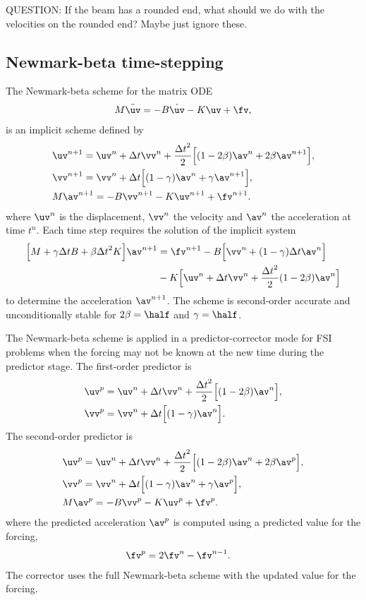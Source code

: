 \documentclass[11pt]{article}
\newcommand{\dt}{{\Delta t}}
\begin{document}
QUESTION: If the beam has a rounded end, what should we do with the velocities on the rounded end? Maybe just ignore
these. 


\subsection{Newmark-beta time-stepping}
The Newmark-beta scheme for the matrix ODE 
\begin{align*}
   M \ddot\uv = -B \dot\uv - K \uv + \fv ,
\end{align*}
is an implicit scheme defined by
\begin{align*}
 &  \uv^{n+1} = \uv^n + \dt\vv^n + \frac{\dt^2}{2}\Big[ (1-2\beta) \av^n + 2\beta \av^{n+1} \Big],  \\
 &  \vv^{n+1} = \vv^n + \dt\Big[  (1-\gamma) \av^n + \gamma \av^{n+1} \Big]    , \\
 &  M \av^{n+1} = -B \vv^{n+1} -K \uv^{n+1} + \fv^{n+1} .
\end{align*}
where $\uv^n$ is the displacement, $\vv^n$ the velocity and $\av^n$ the acceleration at time $t^n$. 
Each time step requires the solution of the implicit system
\begin{align}
  \Big[ M + \gamma\dt B + \beta\dt^2 K \Big] \av^{n+1} &=
      \fv^{n+1} 
      - B \Big[ \vv^n + (1-\gamma) \dt \av^n \Big] \nonumber \\
    &  - K\Big[ \uv^n + \dt\vv^n + \frac{\dt^2}{2} (1-2\beta) \av^n \Big] 
   \label{eq:NewmarkMatrix}
\end{align}
to determine the acceleration $\av^{n+1}$. 
The scheme is second-order accurate and unconditionally stable for $2\beta=\half$ and $\gamma=\half$. 

The Newmark-beta scheme is applied in a predictor-corrector mode for FSI problems when the forcing 
may not be known at the new time during the predictor stage.
The first-order predictor is
\begin{align*}
 &  \uv^{p} = \uv^n + \dt\vv^n + \frac{\dt^2}{2}\Big[ (1-2\beta) \av^n  \Big],  \\
 &  \vv^{p} = \vv^n + \dt\Big[  (1-\gamma) \av^n \Big]    .
\end{align*}
The second-order predictor is
\begin{align*}
 &  \uv^{p} = \uv^n + \dt\vv^n + \frac{\dt^2}{2}\Big[ (1-2\beta) \av^n + 2\beta \av^{p} \Big],  \\
 &  \vv^{p} = \vv^n + \dt\Big[  (1-\gamma) \av^n + \gamma \av^{p} \Big], \\
 &  M \av^{p} = -B \vv^{p} -K \uv^{p} + \fv^{p} .  
\end{align*}
where the predicted acceleration $\av^{p}$ is computed using a predicted value for the forcing,
\begin{align*}
 &  \fv^{p} = 2 \fv^{n} - \fv^{n-1} .
\end{align*}
The corrector uses the full Newmark-beta scheme with the updated value for the forcing.
\end{document}
